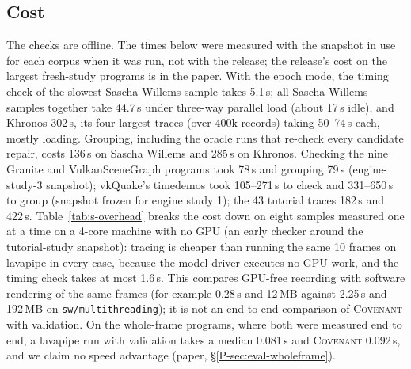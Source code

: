 \documentclass[acmtog,anonymous,review]{acmart}
\newcommand{\sys}{\textsc{Covenant}\xspace}
\newcommand{\code}[1]{\texttt{#1}}
\begin{document}
\subsection{Cost}
The checks are offline. The times below were measured with the snapshot in use for each corpus when it was run, not
with the release; the release's cost on the largest fresh-study programs is in the paper. With the epoch mode, the timing check of the slowest Sascha Willems sample takes 5.1\,s; all
Sascha Willems samples together take 44.7\,s under three-way parallel load (about 17\,s idle), and Khronos 302\,s, its four
largest traces (over 400k records) taking 50--74\,s each, mostly loading. Grouping, including the oracle runs that
re-check every candidate repair, costs 136\,s on Sascha Willems and 285\,s on Khronos. Checking the nine Granite and
VulkanSceneGraph programs took 78\,s and grouping 79\,s (engine-study-3 snapshot); vkQuake's timedemos took
105--271\,s to check and 331--650\,s to group (snapshot frozen for engine study 1); the 43 tutorial traces 182\,s and 422\,s. Table~\ref{tab:s-overhead} breaks the cost down on eight
samples measured one at a time on a 4-core machine with no GPU (an early checker around the tutorial-study snapshot):
tracing is cheaper than running the
same 10 frames on lavapipe in every case, because the model driver executes no GPU work, and the timing check takes at
most 1.6\,s. This compares GPU-free recording with software rendering of the same frames (for example 0.28\,s and
12\,MB against 2.25\,s and 192\,MB on \code{sw/multithreading}); it is not an end-to-end comparison of \sys with
validation. On the whole-frame programs, where both were measured end to end, a lavapipe run with validation takes a
median 0.081\,s and \sys 0.092\,s, and we claim no speed advantage (paper, \S\ref{P-sec:eval-wholeframe}).
\end{document}
